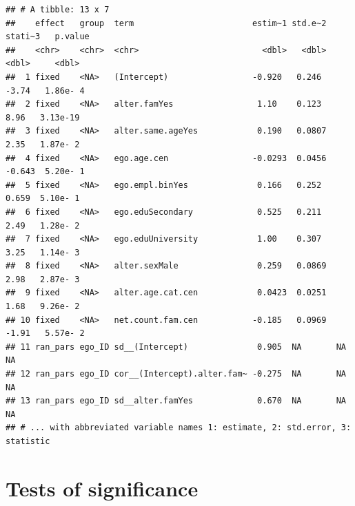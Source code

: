 \documentclass[
]{book}
\begin{document}
\begin{verbatim}
## # A tibble: 13 x 7
##    effect   group  term                        estim~1 std.e~2 stati~3   p.value
##    <chr>    <chr>  <chr>                         <dbl>   <dbl>   <dbl>     <dbl>
##  1 fixed    <NA>   (Intercept)                 -0.920   0.246   -3.74   1.86e- 4
##  2 fixed    <NA>   alter.famYes                 1.10    0.123    8.96   3.13e-19
##  3 fixed    <NA>   alter.same.ageYes            0.190   0.0807   2.35   1.87e- 2
##  4 fixed    <NA>   ego.age.cen                 -0.0293  0.0456  -0.643  5.20e- 1
##  5 fixed    <NA>   ego.empl.binYes              0.166   0.252    0.659  5.10e- 1
##  6 fixed    <NA>   ego.eduSecondary             0.525   0.211    2.49   1.28e- 2
##  7 fixed    <NA>   ego.eduUniversity            1.00    0.307    3.25   1.14e- 3
##  8 fixed    <NA>   alter.sexMale                0.259   0.0869   2.98   2.87e- 3
##  9 fixed    <NA>   alter.age.cat.cen            0.0423  0.0251   1.68   9.26e- 2
## 10 fixed    <NA>   net.count.fam.cen           -0.185   0.0969  -1.91   5.57e- 2
## 11 ran_pars ego_ID sd__(Intercept)              0.905  NA       NA     NA       
## 12 ran_pars ego_ID cor__(Intercept).alter.fam~ -0.275  NA       NA     NA       
## 13 ran_pars ego_ID sd__alter.famYes             0.670  NA       NA     NA       
## # ... with abbreviated variable names 1: estimate, 2: std.error, 3: statistic
\end{verbatim}

\hypertarget{tests-of-significance}{%
\section{Tests of significance}\label{tests-of-significance}}
\end{document}

